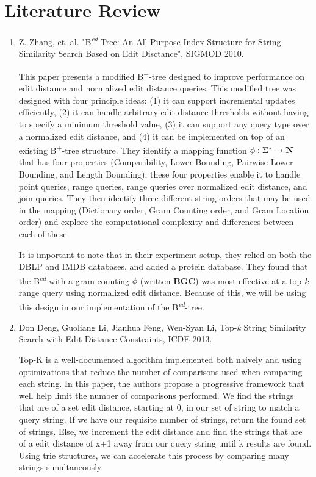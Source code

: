 \documentclass[pdftex,12pt,letter]{article}
\begin{document}
\section{Literature Review}
\begin{enumerate}
\item Z. Zhang, et. al. "B\textsuperscript{\textit{ed}}-Tree: An All-Purpose Index Structure for String Similarity Search Based on Edit Disctance", SIGMOD 2010.

This paper presents a modified B\textsuperscript{+}-tree designed to improve performance on edit distance and normalized edit distance queries. This modified tree was designed with four principle ideas: (1) it can support incremental updates efficiently, (2) it can handle arbitrary edit distance thresholds without having to specify a minimum threshold value, (3) it can support any query type over a normalized edit distance, and (4) it can be implemented on top of an existing B\textsuperscript{+}-tree structure. They identify a mapping function $\phi : \Sigma^{*}\rightarrow \bf{N}$ that has four properties (Comparibility, Lower Bounding, Pairwise Lower Bounding, and Length Bounding); these four properties enable it to handle point queries, range queries, range queries over normalized edit distance, and join queries. They then identify three different string orders that may be used in the mapping (Dictionary order, Gram Counting order, and Gram Location order) and explore the computational complexity and differences between each of these. 

It is important to note that in their experiment setup, they relied on both the DBLP and IMDB databases, and added a protein database. They found that the B\textsuperscript{\textit{ed}} with a gram counting $\phi$ (written \textbf{BGC}) was most effective at a top-\textit{k} range query using normalized edit distance. Because of this, we will be using this design in our implementation of the B\textsuperscript{\textit{ed}}-tree.

\item Don Deng, Guoliang Li, Jianhua Feng, Wen-Syan Li, Top-\textit{k} String Similarity Search with Edit-Distance Constraints, ICDE 2013.

	Top-K is a well-documented algorithm implemented both naively and using optimizations that reduce the number of comparisons used when comparing each string. In this paper, the authors propose a progressive framework that well help limit the number of comparisons performed. We find the strings that are of a set edit distance, starting at 0, in our set of string to match a query string. If we have our requisite number of strings, return the found set of strings. Else, we increment the edit distance and find the strings that are of a edit distance of x+1 away from our query string until k results are found. Using trie structures, we can accelerate this process by comparing many strings simultaneously.


\end{enumerate}
\end{document}
